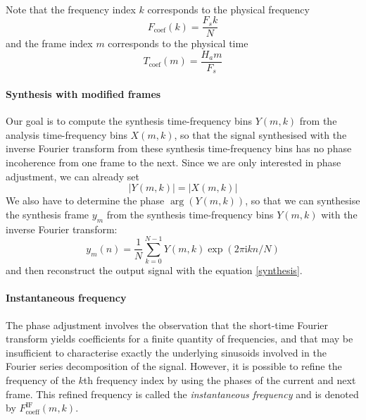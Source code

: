 \documentclass[letterpaper]{article}
\begin{document}
\paragraph{}
Note that the frequency index \(k\) corresponds to the physical frequency
\begin{equation}
		\label{frequency_index}
    F_{\text{coef}}(k) = \frac{F_s k}{N}
\end{equation}
and the frame index \(m\) corresponds to the physical time
\begin{equation}
    T_{\text{coef}}(m) = \frac{H_a m}{F_s}
\end{equation}
\paragraph{Synthesis with modified frames}
Our goal is to compute the synthesis time-frequency bins \(Y(m,k)\) from the analysis
time-frequency bins \(X(m,k)\), so that the signal synthesised with the inverse
Fourier transform from these synthesis time-frequency bins has no phase incoherence
from one frame to the next. Since we are only interested in phase adjustment,
we can already set
\begin{equation}
    |Y(m,k)| = |X(m,k)|
\end{equation}
We also have to determine the phase \(\arg(Y(m,k))\), so that we can synthesise
the synthesis frame \(y_m\) from the synthesis time-frequency bins \(Y(m,k)\) with
the inverse Fourier transform:
\begin{equation}
		y_m(n)=\frac{1}{N}\sum_{k=0}^{N-1}Y(m,k)\exp(2\pi\text{i}kn/N)
\end{equation}
and then reconstruct the output signal with the equation \eqref{synthesis}.

\paragraph{Instantaneous frequency}
The phase adjustment involves the observation that the short-time Fourier
transform yields coefficients for a finite quantity of frequencies, and that may
be insufficient to characterise exactly the underlying sinusoids involved in the
Fourier series decomposition of the signal. However, it is possible to refine
the frequency of the \(k\)th frequency index by using the phases of the current
and next frame. This refined frequency is called the \emph{instantaneous
frequency} and is denoted by \(F_{\text{coeff}}^{\text{IF}}(m,k)\).
\end{document}
